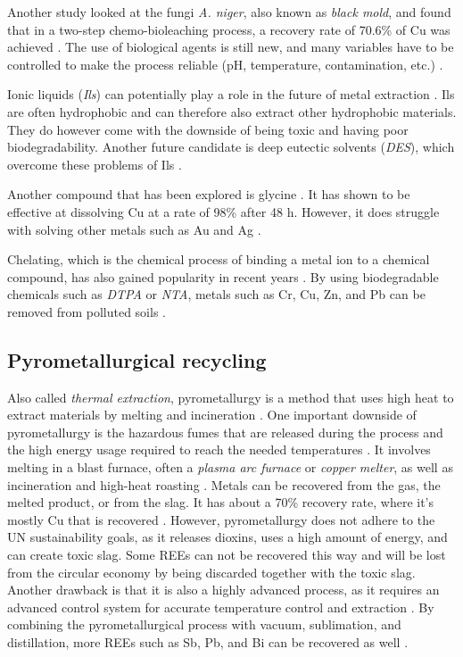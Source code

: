 Another study looked at the fungi \textit{A. niger}, also known as \textit{black mold}, and found that in a two-step chemo-bioleaching process, a recovery rate of 70.6\% of Cu was achieved \cite{ANiger}. The use of biological agents is still new, and many variables have to be controlled to make the process reliable (pH, temperature, contamination, etc.) \cite{javed2024}. 

Ionic liquids (\textit{Ils}) can potentially play a role in the future of metal extraction \cite{javed2024}. Ils are often hydrophobic and can therefore also extract other hydrophobic materials. They do however come with the downside of being toxic and having poor biodegradability. Another future candidate is deep eutectic solvents (\textit{DES}), which overcome these problems of Ils \cite{javed2024}. 

Another compound that has been explored is glycine \cite{glycine}. It has shown to be effective at dissolving Cu at a rate of 98\% after 48 h. However, it does struggle with solving other metals such as Au and Ag \cite{javed2024}.

Chelating, which is the chemical process of binding a metal ion to a chemical compound, has also gained popularity in recent years \cite{javed2024}. By using biodegradable chemicals such as \textit{DTPA} or \textit{NTA}, metals such as Cr, Cu, Zn, and Pb can be removed from polluted soils \cite{javed2024}.

\subsection{Pyrometallurgical recycling}

Also called \textit{thermal extraction}, pyrometallurgy is a method that uses high heat to extract materials by melting and incineration \cite{javed2024}. One important downside of pyrometallurgy is the hazardous fumes that are released during the process and the high energy usage required to reach the needed temperatures \cite{pyro}. It involves melting in a blast furnace, often a \textit{plasma arc furnace} or \textit{copper melter}, as well as incineration and high-heat roasting \cite{pyro}. Metals can be recovered from the gas, the melted product, or from the slag. It has about a 70\% recovery rate, where it's mostly Cu that is recovered \cite{REEEmerging}. However, pyrometallurgy does not adhere to the UN sustainability goals, as it releases dioxins, uses a high amount of energy, and can create toxic slag. Some REEs can not be recovered this way and will be lost from the circular economy by being discarded together with the toxic slag. Another drawback is that it is also a highly advanced process, as it requires an advanced control system for accurate temperature control and extraction \cite{REEEmerging}. By combining the pyrometallurgical process with vacuum, sublimation, and distillation, more REEs such as Sb, Pb, and Bi can be recovered as well \cite{REEEmerging}.